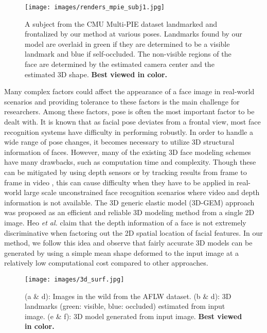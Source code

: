 \documentclass[10pt,twocolumn,letterpaper]{article}
\begin{document}
\begin{figure}[t!]
\centering
\texttt{[image: images/renders\_mpie\_subj1.jpg]}
\caption{A subject from the CMU Multi-PIE dataset \cite{mpie1,mpie2} landmarked and frontalized by our method at various poses. Landmarks found by our model are overlaid in green if they are determined to be a visible landmark and blue if self-occluded. The non-visible regions of the face are determined by the estimated camera center and the estimated 3D shape. \textbf{Best viewed in color.}}
\label{fig:frontalization}
\end{figure}

Many complex factors could affect the appearance of a face image in real-world scenarios and providing tolerance to these factors is the main challenge for researchers. Among these factors, pose is often the most important factor to be dealt with. It is known that as facial pose deviates from a frontal view, most face recognition systems have difficulty in performing robustly. In order to handle a wide range of pose changes, it becomes necessary to utilize 3D structural information of faces. However, many of the existing 3D face modeling schemes ~\cite{Atick96,Blanz02,Wang06} have many drawbacks, such as computation time and complexity. Though these can be mitigated by using depth sensors \cite{Hsieh2015} or by tracking results from frame to frame in video \cite{Saito2016}, this can cause difficulty when they have to be applied in real-world large scale unconstrained face recognition scenarios where video and depth information is not available. The 3D generic elastic model (3D-GEM) approach was proposed as an efficient and reliable 3D modeling method from a single 2D image. Heo \emph{et al.} \cite{jheo_gem_2009,GEM_2011} claim that the depth information of a face is not extremely discriminative when factoring out the 2D spatial location of facial features. In our method, we follow this idea and observe that fairly accurate 3D models can be generated by using a simple mean shape deformed to the input image at a relatively low computational cost compared to other approaches.

\begin{figure}[t!]
\centering
\texttt{[image: images/3d\_surf.jpg]}
\caption{(a \& d): Images in the wild from the AFLW dataset. (b \& d): 3D landmarks (green: visible, blue: occluded) estimated from input image. (e \&  f): 3D model generated from input image. \textbf{Best viewed in color.}}
\label{fig:3d_surf}
\end{figure}
\end{document}
